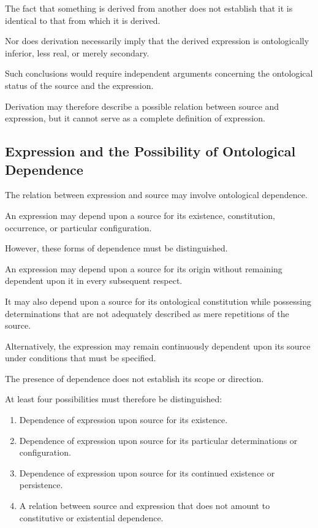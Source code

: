 The fact that something is derived from another
does not establish that it is identical to that
from which it is derived.

Nor does derivation necessarily imply that
the derived expression is ontologically inferior,
less real, or merely secondary.

Such conclusions would require independent
arguments concerning the ontological status
of the source and the expression.

Derivation may therefore describe a possible
relation between source and expression, but
it cannot serve as a complete definition of
expression.

\subsection{Expression and the Possibility of Ontological Dependence}

The relation between expression and source
may involve ontological dependence.

An expression may depend upon a source for
its existence, constitution, occurrence, or
particular configuration.

However, these forms of dependence must be
distinguished.

An expression may depend upon a source for
its origin without remaining dependent upon
it in every subsequent respect.

It may also depend upon a source for its
ontological constitution while possessing
determinations that are not adequately
described as mere repetitions of the source.

Alternatively, the expression may remain
continuously dependent upon its source under
conditions that must be specified.

The presence of dependence does not establish
its scope or direction.

At least four possibilities must therefore
be distinguished:

\begin{enumerate}
    \item Dependence of expression upon source
    for its existence.

    \item Dependence of expression upon source
    for its particular determinations or configuration.

    \item Dependence of expression upon source
    for its continued existence or persistence.

    \item A relation between source and expression
    that does not amount to constitutive or
    existential dependence.
\end{enumerate}

